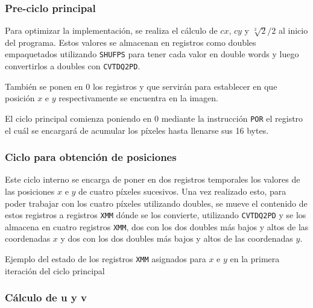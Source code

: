 \subsubsection{Pre-ciclo principal}

Para optimizar la implementación, se realiza el cálculo de $cx$, $cy$ y $\sqrt[2]{2}/2$ al inicio del programa. Estos valores se almacenan en registros como doubles empaquetados utilizando \texttt{SHUFPS} para tener cada valor en double words y luego convertirlos a doubles con \texttt{CVTDQ2PD}.

También se ponen en 0 los registros  y  que servirán para establecer en que posición $x$ e $y$ respectivamente se encuentra en la imagen.

El ciclo principal comienza poniendo en 0 mediante la instrucción \texttt{POR} el registro  el cuál se encargará de acumular los píxeles hasta llenarse sus 16 bytes.


\subsubsection{Ciclo para obtención de posiciones}

Este ciclo interno se encarga de poner en dos registros temporales los valores de las posiciones $x$ e $y$ de cuatro píxeles sucesivos. Una vez realizado esto, para poder trabajar con los cuatro píxeles utilizando doubles, se mueve el contenido de estos registros a registros \texttt{XMM} dónde se los convierte, utilizando \texttt{CVTDQ2PD} y se los almacena en cuatro registros \texttt{XMM}, dos con los dos doubles más bajos y altos de las coordenadas $x$ y dos con los dos doubles más bajos y altos de las coordenadas $y$.

\begin{center}
\end{center}

Ejemplo del estado de los registros \texttt{XMM} asignados para $x$ e $y$ en la primera iteración del ciclo principal


\subsubsection{Cálculo de u y v}

